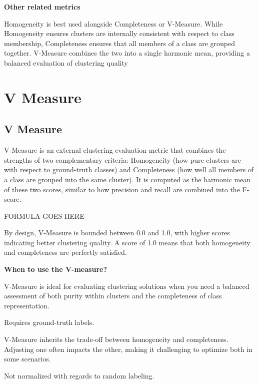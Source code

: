 \clearpage

\thispagestyle{customstyle}

\textbf{Other related metrics}

Homogeneity is best used alongside Completeness or V-Measure. While Homogeneity ensures clusters are internally consistent with
respect to class membership, Completeness ensures that all members of a class are grouped together. V-Measure combines the two
into a single harmonic mean, providing a balanced evaluation of clustering quality

\clearpage
\thispagestyle{clusteringstyle}
\section{V Measure}
\subsection{V Measure}

V-Measure is an external clustering evaluation metric that combines the strengths of two complementary criteria: Homogeneity
(how pure clusters are with respect to ground-truth classes) and Completeness (how well all members of a class are grouped into
the same cluster). It is computed as the harmonic mean of these two scores, similar to how precision and recall are combined into
the F-score.

\begin{center}
    FORMULA GOES HERE
\end{center}

By design, V-Measure is bounded between 0.0 and 1.0, with higher scores indicating better clustering quality. A score of 1.0
means that both homogeneity and completeness are perfectly satisfied.

\textbf{When to use the V-measure?}

V-Measure is ideal for evaluating clustering solutions when you need a balanced assessment of both purity within clusters and the
completeness of class representation.

{
    \item Requires ground-truth labels.
    \item V-Measure inherits the trade-off between homogeneity and completeness. Adjusting one often impacts the other, making it
    challenging to optimize both in some scenarios.
    \item Not normalized with regards to random labeling.
}

